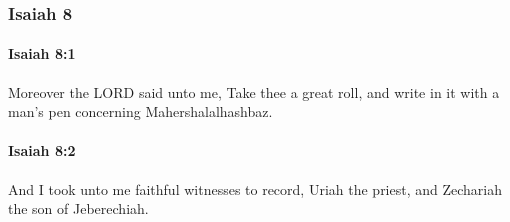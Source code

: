 	\subsubsection{Isaiah 8} %
		\label{ISAIAH-8}

		\paragraph{Isaiah 8:1} %
			\label{ISAIAH-8-1}

			Moreover the LORD said unto me, Take thee a great roll, and write in it with a man's pen concerning Mahershalalhashbaz.


		\paragraph{Isaiah 8:2} %
			\label{ISAIAH-8-2}

			And I took unto me faithful witnesses to record, Uriah the priest, and Zechariah the son of Jeberechiah.

